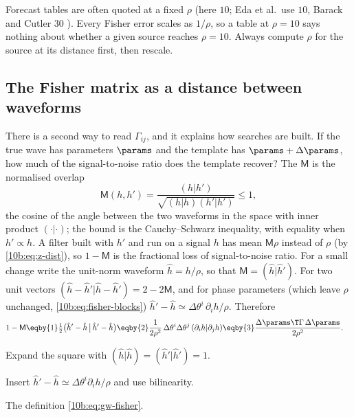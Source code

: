 \begin{pitfall}
Forecast tables are often quoted at a fixed $\rho$ (here $10$; Eda et al.\ use $10$, Barack and Cutler $30$
\cite{BarackCutler2004}). Every Fisher error scales as $1/\rho$, so a table at $\rho=10$ says nothing about whether a
given source reaches $\rho=10$. Always compute $\rho$ for the source at its distance first, then rescale.
\end{pitfall}

\subsection{The Fisher matrix as a distance between waveforms}
\label{10b:sec:metric}

There is a second way to read $\Gamma_{ij}$, and it explains how searches are built. If the true wave has parameters
$\params$ and the template has $\params+\Delta\params$, how much of the signal-to-noise ratio does the template recover?
The  $\mathsf M$ is the normalised overlap
\begin{equation}
  \mathsf M(h,h')=\frac{(h|h')}{\sqrt{(h|h)(h'|h')}}\le1,
\end{equation}
the cosine of the angle between the two waveforms in the space with inner product $(\cdot|\cdot)$; the bound is the
Cauchy--Schwarz inequality, with equality when $h'\propto h$. A filter built with $h'$ and run on a signal $h$ has mean $\mathsf M\rho$ instead of $\rho$ (by
\eqref{10b:eq:z-dist}), so $1-\mathsf M$ is the fractional loss of signal-to-noise ratio. For a small change write the
unit-norm waveform $\hat h=h/\rho$, so that $\mathsf M=(\hat h|\hat h')$. For two unit vectors
$(\hat h-\hat h'|\hat h-\hat h')=2-2\mathsf M$, and for phase parameters (which leave $\rho$ unchanged,
\cref{10b:eq:fisher-blocks}) $\hat h'-\hat h\simeq\Delta\theta^i\,\partial_ih/\rho$. Therefore
\begin{align}
  1-\mathsf M
  &\eqby{1}\tfrac12\big(\hat h'-\hat h\,\big|\,\hat h'-\hat h\big)
   \eqby{2}\frac{1}{2\rho^2}\,\Delta\theta^i\Delta\theta^j\,(\partial_ih|\partial_jh)
   \eqby{3}\frac{\Delta\params\T\Gamma\,\Delta\params}{2\rho^2}.
  \label{10b:eq:match-metric}
\end{align}
\begin{explain}
  \item Expand the square with $(\hat h|\hat h)=(\hat h'|\hat h')=1$.
  \item Insert $\hat h'-\hat h\simeq\Delta\theta^i\partial_ih/\rho$ and use bilinearity.
  \item The definition \eqref{10b:eq:gw-fisher}.
\end{explain}
